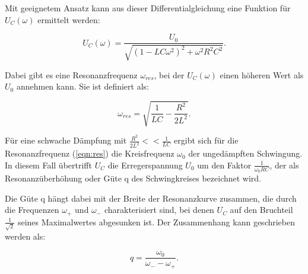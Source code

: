 \noindent
Mit geeignetem Ansatz kann aus dieser Differentialgleichung eine Funktion für $U_C(\omega)$ ermittelt werden:

\begin{equation}
U_C(\omega) = \frac{U_0}{\sqrt{(1-LC\omega^2)^2 + \omega^2 R^2 C^2}}.
\label{eqn:uc}
\end{equation}

\noindent
Dabei gibt es eine Resonanzfrequenz $\omega_{res}$, bei der $U_C(\omega)$ einen höheren Wert als $U_0$ annehmen kann.
Sie ist definiert als:

\begin{equation}
\omega_{res} = \sqrt{\frac{1}{LC} - \frac{R^2}{2L^2}}.
\label{eqn:res}
\end{equation}

\noindent
Für eine schwache Dämpfung mit $\frac{R^2}{2L^2} << \frac{1}{LC}$ ergibt sich für die Resonanzfrequenz (\ref{eqn:res}) die Kreisfrequenz $\omega_0$ der ungedämpften Schwingung.
In diesem Fall übertrifft $U_C$ die Erregerspannung $U_0$ um den Faktor $\frac{1}{\omega_0 RC}$, 
der als Resonanzüberhöhung oder Güte q des Schwingkreises bezeichnet wird.

\noindent
Die Güte q hängt dabei mit der Breite der Resonanzkurve zusammen, 
die durch die Frequenzen $\omega_+$ und $\omega_-$ charakterisiert sind,
bei denen $U_C$ auf den Bruchteil $\frac{1}{\sqrt{2}}$ seines Maximalwertes abgesunken ist.
Der Zusammenhang kann geschrieben werden als:

\begin{equation}
q = \frac{\omega_0}{\omega_- - \omega_+}.
\label{eqn:guete}
\end{equation}

 


